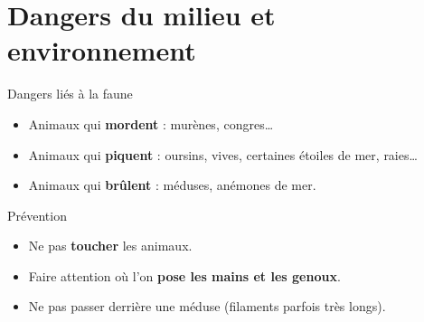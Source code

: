 \section{Dangers du milieu et environnement}

\begin{frame}{Dangers liés à la faune}
  \begin{itemize}
    \item Animaux qui \textbf{mordent} : murènes, congres…
    \item Animaux qui \textbf{piquent} : oursins, vives, certaines étoiles de mer, raies…
    \item Animaux qui \textbf{brûlent} : méduses, anémones de mer.
  \end{itemize}

  \begin{block}{Prévention}
    \begin{itemize}
      \item Ne pas \textbf{toucher} les animaux.
      \item Faire attention où l'on \textbf{pose les mains et les genoux}.
      \item Ne pas passer derrière une méduse (filaments parfois très longs).
    \end{itemize}
  \end{block}
\end{frame}

